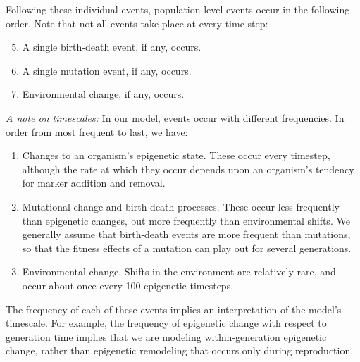 \documentclass{article}
\begin{document}
Following these individual events, population-level events occur in the following order. Note that not all events take place at every time step:
\begin{enumerate}
  \setcounter{enumi}{4}
    \item A single birth-death event, if any, occurs.
    \item A single mutation event, if any, occurs.
    \item Environmental change, if any, occurs.
\end{enumerate}

\textit{A note on timescales:} In our model, events occur with different frequencies. In order from most frequent to last, we have:
\begin{enumerate}
    \item Changes to an organism's epigenetic state. These occur every timestep, although the rate at which they occur depends upon an organism's tendency for marker addition and removal.

    \item Mutational change and birth-death processes. These occur less frequently than epigenetic changes, but more frequently than environmental shifts. We generally assume that birth-death events are more frequent than mutations, so that the fitness effects of a mutation can play out for several generations.

    \item Environmental change. Shifts in the environment are relatively rare, and occur about once every 100 epigenetic timesteps. 
\end{enumerate}

The frequency of each of these events implies an interpretation of the model's timescale. For example, the frequency of epigenetic change with respect to generation time implies that we are modeling within-generation epigenetic change, rather than epigenetic remodeling that occurs only during reproduction.
\end{document}
